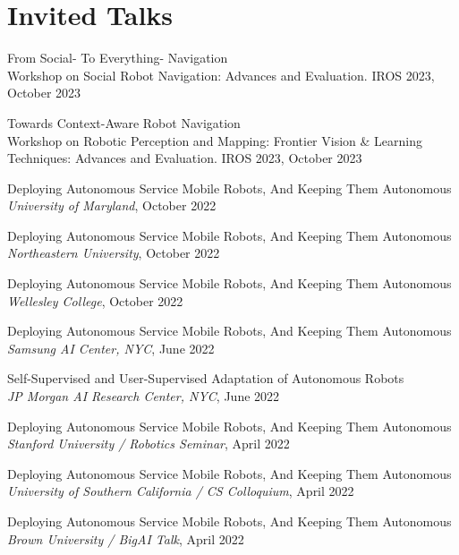 \documentclass[Times]{article}
\begin{document}
\begin{comment}
Updates:
5. Find all SPC, PC appointments
6. List all students
\end{comment}

\section*{Invited Talks}

From Social- To Everything- Navigation
\\
{Workshop on Social Robot Navigation: Advances and Evaluation. IROS 2023},
October 2023


Towards Context-Aware Robot Navigation
\\
{Workshop on Robotic Perception and Mapping: Frontier Vision \& Learning Techniques: Advances and Evaluation. IROS 2023},
October 2023


Deploying Autonomous Service Mobile Robots, And Keeping Them Autonomous
\\
{\em University of Maryland}, October 2022

Deploying Autonomous Service Mobile Robots, And Keeping Them Autonomous
\\
{\em Northeastern University}, October 2022

Deploying Autonomous Service Mobile Robots, And Keeping Them Autonomous
\\
{\em Wellesley College}, October 2022

Deploying Autonomous Service Mobile Robots, And Keeping Them Autonomous
\\
{\em Samsung AI Center, NYC}, June 2022

Self-Supervised and User-Supervised Adaptation of Autonomous Robots
\\
{\em JP Morgan AI Research Center, NYC}, June 2022

Deploying Autonomous Service Mobile Robots, And Keeping Them Autonomous
\\
{\em Stanford University / Robotics Seminar}, April 2022

Deploying Autonomous Service Mobile Robots, And Keeping Them Autonomous
\\
{\em University of Southern California / CS Colloquium}, April 2022

Deploying Autonomous Service Mobile Robots, And Keeping Them Autonomous
\\
{\em Brown University / BigAI Talk}, April 2022
\end{document}
